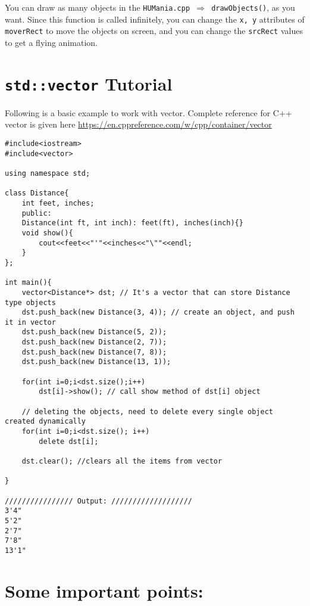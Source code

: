 \documentclass[a4paper,12pt]{article}
\begin{document}
	You can draw as many objects in the \texttt{HUMania.cpp $ \Rightarrow $ drawObjects()}, as you want. Since this function is called infinitely, you can change the \texttt{x, y} attributes of \texttt{moverRect} to move the objects on screen, and you can change the \texttt{srcRect} values to get a flying animation.
	


\section{\texttt{std::vector} Tutorial} \label{vectorTutorial}

Following is a basic example to work with vector. Complete reference for C++ vector is given here \url{https://en.cppreference.com/w/cpp/container/vector}
\begin{lstlisting}
#include<iostream>
#include<vector>

using namespace std;

class Distance{
	int feet, inches;
	public:
	Distance(int ft, int inch): feet(ft), inches(inch){}
	void show(){
		cout<<feet<<"'"<<inches<<"\""<<endl;
	}
};

int main(){
	vector<Distance*> dst; // It's a vector that can store Distance type objects
	dst.push_back(new Distance(3, 4)); // create an object, and push it in vector
	dst.push_back(new Distance(5, 2));
	dst.push_back(new Distance(2, 7));
	dst.push_back(new Distance(7, 8));
	dst.push_back(new Distance(13, 1));
	
	for(int i=0;i<dst.size();i++)
		dst[i]->show(); // call show method of dst[i] object
		
	// deleting the objects, need to delete every single object created dynamically
	for(int i=0;i<dst.size(); i++)
		delete dst[i];
	
	dst.clear(); //clears all the items from vector
	
}

//////////////// Output: ///////////////////
3'4"
5'2"
2'7"
7'8"
13'1"
\end{lstlisting}


\section{Some important points:} 
\end{document}
